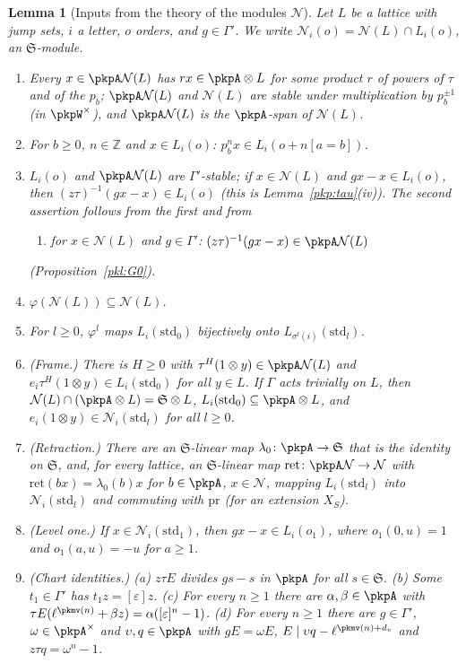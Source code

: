 \documentclass[10pt]{amsart}
\newtheorem{lemma}[theorem]{Lemma}
\theoremstyle{definition}
\theoremstyle{remark}
\newcommand{\Z}{\mathbb Z}
\begin{document}
\begin{lemma}[Inputs from the theory of the modules $\mathcal N$]\label{pkm:inputs}
Let $L$ be a lattice with jump sets, $i$ a letter, $o$ orders, and $g\in\Gamma'$. We write
$\mathcal N_i(o)=\mathcal N(L)\cap L_i(o)$, an $\mathfrak S$-module.
\begin{enumerate}
\item[(M)] Every $x\in\pkpA\mathcal N(L)$ has $rx\in\pkpA\otimes L$ for some product $r$ of powers of
$\tau$ and of the $p_b$; $\pkpA\mathcal N(L)$ and $\mathcal N(L)$ are stable under multiplication by
$p_b^{\pm1}$ (in $\pkpW^\times$), and $\pkpA\mathcal N(L)$ is the $\pkpA$-span of $\mathcal N(L)$.
\item[(E)] For $b\ge0$, $n\in\Z$ and $x\in L_i(o)$: $p_b^nx\in L_i(o+n[a=b])$.
\item[(G)] $L_i(o)$ and $\pkpA\mathcal N(L)$ are $\Gamma'$-stable; if $x\in\mathcal N(L)$
and $gx-x\in L_i(o)$, then $(z\tau)^{-1}(gx-x)\in L_i(o)$ (this is Lemma~\ref{pkp:tau}(iv)). The second assertion follows from the first and from
\begin{enumerate}
\item[(G$_0$)] for $x\in\mathcal N(L)$ and $g\in\Gamma'$: $(z\tau)^{-1}(gx-x)\in\pkpA\mathcal N(L)$
\end{enumerate}
(Proposition~\ref{pkl:G0}).
\item[($\Phi$)] $\varphi(\mathcal N(L))\subseteq\mathcal N(L)$.
\item[(F)] For $l\ge0$, $\varphi^l$ maps $L_i(\mathrm{std}_0)$ bijectively onto
$L_{\sigma^l(i)}(\mathrm{std}_l)$.
\item[(H)] (Frame.) There is $H\ge0$ with $\tau^H(1\otimes y)\in\pkpA\mathcal N(L)$ and
$e_i\tau^H(1\otimes y)\in L_i(\mathrm{std}_0)$ for all $y\in L$. If $\Gamma$ acts trivially on $L$, then
$\mathcal N(L)\cap(\pkpA\otimes L)=\mathfrak S\otimes L$, $L_i(\mathrm{std}_0)\subseteq\pkpA\otimes L$, and
$e_i(1\otimes y)\in\mathcal N_i(\mathrm{std}_l)$ for all $l\ge0$.
\item[(R)] (Retraction.) There are an $\mathfrak S$-linear map $\lambda_0\colon\pkpA\to\mathfrak S$ that is the
identity on $\mathfrak S$, and, for every lattice, an $\mathfrak S$-linear map $\mathrm{ret}\colon
\pkpA\mathcal N\to\mathcal N$ with $\mathrm{ret}(bx)=\lambda_0(b)x$ for $b\in\pkpA$, $x\in\mathcal N$,
mapping $L_i(\mathrm{std}_l)$ into $\mathcal N_i(\mathrm{std}_l)$ and commuting with $\mathrm{pr}$ (for an
extension $X_S$).
\item[(D)] (Level one.) If $x\in\mathcal N_i(\mathrm{std}_1)$, then $gx-x\in L_i(o_1)$, where
$o_1(0,u)=1$ and $o_1(a,u)=-u$ for $a\ge1$.
\item[(C)] (Chart identities.) (a) $z\tau E$ divides $gs-s$ in $\pkpA$ for all $s\in\mathfrak S$.
(b) Some $t_1\in\Gamma'$ has $t_1z=[\varepsilon]z$. (c) For every $n\ge1$ there are
$\alpha,\beta\in\pkpA$ with $\tau E(\ell^{\pkmv(n)}+\beta z)=\alpha([\varepsilon]^n-1)$. (d) For every
$n\ge1$ there are $g\in\Gamma'$, $\omega\in\pkpA^\times$ and $\upsilon,q\in\pkpA$ with $gE=\omega E$,
$E\mid\upsilon q-\ell^{\pkmv(n)+d_v}$ and $z\tau q=\omega^n-1$.
\end{enumerate}
\end{lemma}
\end{document}
